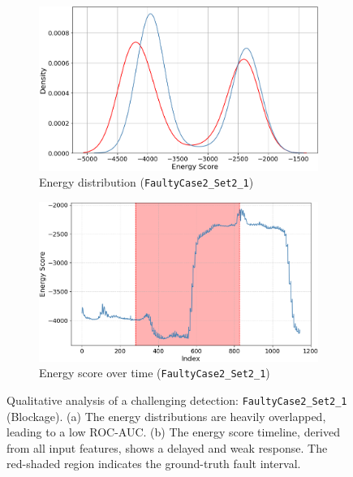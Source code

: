\documentclass{article}
\begin{document}
\begin{figure}[h!]
    \centering
    \begin{subfigure}[b]{0.49\linewidth}
        \centering
        \includegraphics[width=\linewidth]{figures/scores_threshold_energy_distribution_2_2_1.png}
        \caption{Energy distribution (\texttt{FaultyCase2\_Set2\_1})}\label{fig:dist_2_2_1}
    \end{subfigure}
    \hfill
    \begin{subfigure}[b]{0.49\linewidth}
        \centering
        \includegraphics[width=\linewidth]{figures/scores_threshold_energy_over_time_2_2_1.png}
        \caption{Energy score over time (\texttt{FaultyCase2\_Set2\_1})}\label{fig:time_2_2_1}
    \end{subfigure}
    \caption{Qualitative analysis of a challenging detection: \texttt{FaultyCase2\_Set2\_1} (Blockage). (a) The energy distributions are heavily overlapped, leading to a low ROC-AUC. (b) The energy score timeline, derived from all input features, shows a delayed and weak response. The red-shaded region indicates the ground-truth fault interval.}\label{fig:case_2_2_1}
\end{figure}
\end{document}
